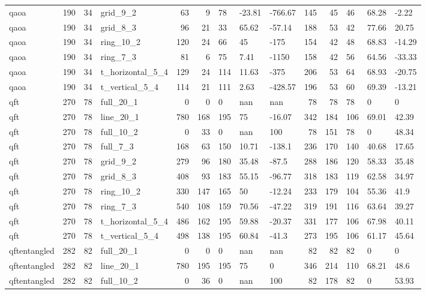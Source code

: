 \begin{longtable}{lrrlrrlllrrlll}
qaoa & 190 & 34 & grid\_9\_2 & 63 & 9 & 78 & -23.81 & -766.67 & 145 & 45 & 46 & 68.28 & -2.22 \\
qaoa & 190 & 34 & grid\_8\_3 & 96 & 21 & 33 & 65.62 & -57.14 & 188 & 53 & 42 & 77.66 & 20.75 \\
qaoa & 190 & 34 & ring\_10\_2 & 120 & 24 & 66 & 45 & -175 & 154 & 42 & 48 & 68.83 & -14.29 \\
qaoa & 190 & 34 & ring\_7\_3 & 81 & 6 & 75 & 7.41 & -1150 & 158 & 42 & 56 & 64.56 & -33.33 \\
qaoa & 190 & 34 & t\_horizontal\_5\_4 & 129 & 24 & 114 & 11.63 & -375 & 206 & 53 & 64 & 68.93 & -20.75 \\
qaoa & 190 & 34 & t\_vertical\_5\_4 & 114 & 21 & 111 & 2.63 & -428.57 & 196 & 53 & 60 & 69.39 & -13.21 \\
qft & 270 & 78 & full\_20\_1 & 0 & 0 & 0 & nan & nan & 78 & 78 & 78 & 0 & 0 \\
qft & 270 & 78 & line\_20\_1 & 780 & 168 & 195 & 75 & -16.07 & 342 & 184 & 106 & 69.01 & 42.39 \\
qft & 270 & 78 & full\_10\_2 & 0 & 33 & 0 & nan & 100 & 78 & 151 & 78 & 0 & 48.34 \\
qft & 270 & 78 & full\_7\_3 & 168 & 63 & 150 & 10.71 & -138.1 & 236 & 170 & 140 & 40.68 & 17.65 \\
qft & 270 & 78 & grid\_9\_2 & 279 & 96 & 180 & 35.48 & -87.5 & 288 & 186 & 120 & 58.33 & 35.48 \\
qft & 270 & 78 & grid\_8\_3 & 408 & 93 & 183 & 55.15 & -96.77 & 318 & 183 & 119 & 62.58 & 34.97 \\
qft & 270 & 78 & ring\_10\_2 & 330 & 147 & 165 & 50 & -12.24 & 233 & 179 & 104 & 55.36 & 41.9 \\
qft & 270 & 78 & ring\_7\_3 & 540 & 108 & 159 & 70.56 & -47.22 & 319 & 191 & 116 & 63.64 & 39.27 \\
qft & 270 & 78 & t\_horizontal\_5\_4 & 486 & 162 & 195 & 59.88 & -20.37 & 331 & 177 & 106 & 67.98 & 40.11 \\
qft & 270 & 78 & t\_vertical\_5\_4 & 498 & 138 & 195 & 60.84 & -41.3 & 273 & 195 & 106 & 61.17 & 45.64 \\
qftentangled & 282 & 82 & full\_20\_1 & 0 & 0 & 0 & nan & nan & 82 & 82 & 82 & 0 & 0 \\
qftentangled & 282 & 82 & line\_20\_1 & 780 & 195 & 195 & 75 & 0 & 346 & 214 & 110 & 68.21 & 48.6 \\
qftentangled & 282 & 82 & full\_10\_2 & 0 & 36 & 0 & nan & 100 & 82 & 178 & 82 & 0 & 53.93 \\

\end{longtable}
